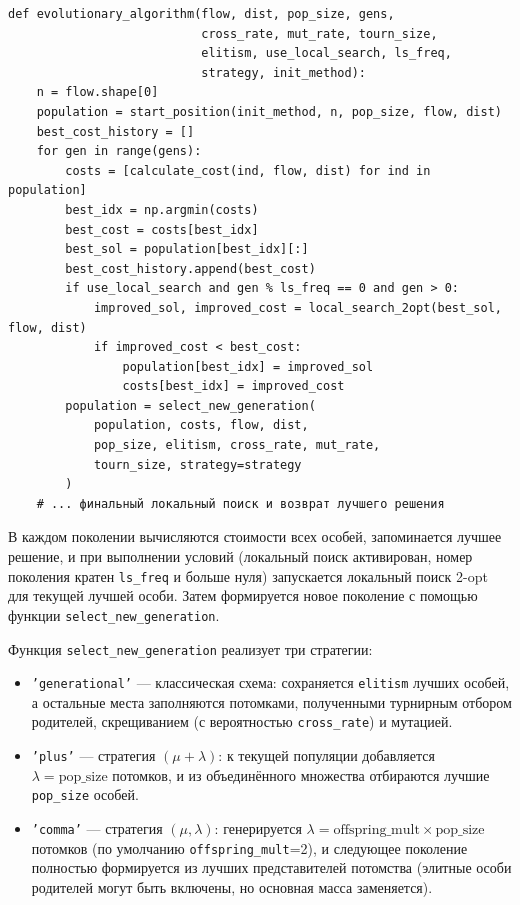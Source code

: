\documentclass[732]{studrep}
\theoremstyle{nonumberplain}
\begin{document}
\begin{listing}[htbp]
\begin{verbatim}
def evolutionary_algorithm(flow, dist, pop_size, gens,
                           cross_rate, mut_rate, tourn_size,
                           elitism, use_local_search, ls_freq,
                           strategy, init_method):
    n = flow.shape[0]
    population = start_position(init_method, n, pop_size, flow, dist)
    best_cost_history = []
    for gen in range(gens):
        costs = [calculate_cost(ind, flow, dist) for ind in population]
        best_idx = np.argmin(costs)
        best_cost = costs[best_idx]
        best_sol = population[best_idx][:]
        best_cost_history.append(best_cost)
        if use_local_search and gen % ls_freq == 0 and gen > 0:
            improved_sol, improved_cost = local_search_2opt(best_sol, flow, dist)
            if improved_cost < best_cost:
                population[best_idx] = improved_sol
                costs[best_idx] = improved_cost
        population = select_new_generation(
            population, costs, flow, dist,
            pop_size, elitism, cross_rate, mut_rate,
            tourn_size, strategy=strategy
        )
    # ... финальный локальный поиск и возврат лучшего решения
\end{verbatim}
\caption{Основной цикл эволюционного алгоритма.}
\label{lst:ea}
\end{listing}

В каждом поколении вычисляются стоимости всех особей, запоминается лучшее решение, и при выполнении условий (локальный поиск активирован, номер поколения кратен \texttt{ls\_freq} и больше нуля) запускается локальный поиск 2-opt для текущей лучшей особи. Затем формируется новое поколение с помощью функции \texttt{select\_new\_generation}.

Функция \texttt{select\_new\_generation} реализует три стратегии:
\begin{itemize}
\item \texttt{'generational'} — классическая схема: сохраняется \texttt{elitism} лучших особей, а остальные места заполняются потомками, полученными турнирным отбором родителей, скрещиванием (с вероятностью \texttt{cross\_rate}) и мутацией.
\item \texttt{'plus'} — стратегия $(\mu + \lambda)$: к текущей популяции добавляется $\lambda = \text{pop\_size}$ потомков, и из объединённого множества отбираются лучшие \texttt{pop\_size} особей.
\item \texttt{'comma'} — стратегия $(\mu, \lambda)$: генерируется $\lambda = \text{offspring\_mult} \times \text{pop\_size}$ потомков (по умолчанию \texttt{offspring\_mult}=2), и следующее поколение полностью формируется из лучших представителей потомства (элитные особи родителей могут быть включены, но основная масса заменяется).
\end{itemize}
\end{document}
